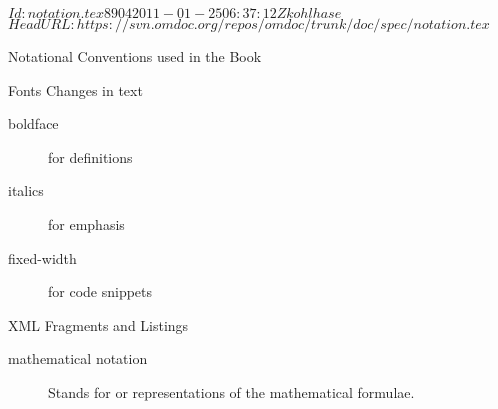 \svnInfo $Id: notation.tex 8904 2011-01-25 06:37:12Z kohlhase $
\svnKeyword $HeadURL: https://svn.omdoc.org/repos/omdoc/trunk/doc/spec/notation.tex $

\begin{omgroup}[id=notation]{Notational Conventions used in the Book}

\begin{omgroup}[id=notation.fonts]{Fonts Changes in text}

  \begin{description}
  \item[boldface] for definitions
  \item[italics] for emphasis
  \item[fixed-width] for code snippets
  \end{description}
\end{omgroup}

\begin{omgroup}[id=notation.xml]{XML Fragments and Listings}

  \begin{description}
  \item[mathematical notation] Stands for {\openmath} or {\cmathml} representations of the
    mathematical formulae.
  \end{description}
\end{omgroup}
\end{omgroup}
